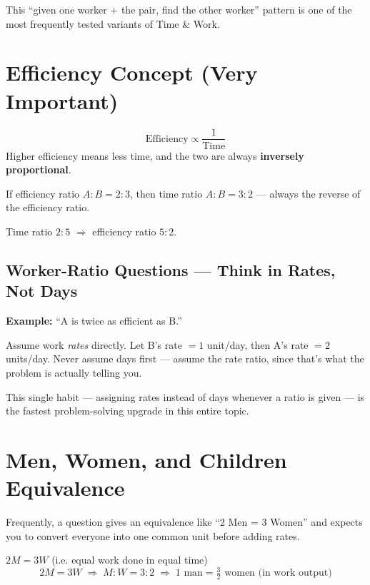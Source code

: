 \documentclass[11pt]{article}
\begin{document}
This ``given one worker + the pair, find the other worker'' pattern is one of the most frequently
tested variants of Time \& Work.

\section{Efficiency Concept (Very Important)}
\begin{formulabox}
\[
\text{Efficiency} \propto \frac{1}{\text{Time}}
\]
Higher efficiency means less time, and the two are always \textbf{inversely proportional}.
\end{formulabox}

If efficiency ratio $A:B = 2:3$, then time ratio $A:B = 3:2$ --- always the reverse of the efficiency
ratio.

\begin{examplebox}[Example]
Time ratio $2:5$ $\Rightarrow$ efficiency ratio $5:2$.
\end{examplebox}

\subsection{Worker-Ratio Questions --- Think in Rates, Not Days}
\textbf{Example:} ``A is twice as efficient as B.''

\begin{tipbox}
Assume work \emph{rates} directly. Let B's rate $= 1$ unit/day, then A's rate $= 2$ units/day. Never
assume days first --- assume the rate ratio, since that's what the problem is actually telling you.
\end{tipbox}

This single habit --- assigning rates instead of days whenever a ratio is given --- is the fastest
problem-solving upgrade in this entire topic.

\section{Men, Women, and Children Equivalence}
Frequently, a question gives an equivalence like ``2 Men = 3 Women'' and expects you to convert
everyone into one common unit before adding rates.

\begin{examplebox}
$2M = 3W$ (i.e. equal work done in equal time)
\[
2M = 3W \;\Rightarrow\; M:W = 3:2 \;\Rightarrow\; 1 \text{ man} = \tfrac{3}{2} \text{ women (in work
output)}
\]
\end{examplebox}
\end{document}

